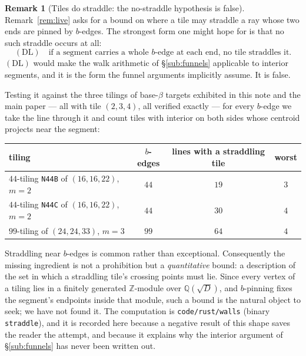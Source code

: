 \documentclass[11pt,reqno]{amsart}
\theoremstyle{plain}
\theoremstyle{definition}
\newtheorem{remark}[theorem]{Remark}
\newcommand{\Q}{\mathbb{Q}}
\begin{document}
\begin{remark}[Tiles do straddle: the no-straddle hypothesis is false]\label{rem:straddle}
Remark~\ref{rem:live} asks for a bound on where a tile may straddle a ray whose two ends are pinned
by $b$-edges. The strongest form one might hope for is that no such straddle occurs at all:
\[
(\mathrm{DL})\quad\text{if a segment carries a whole } b\text{-edge at each end, no tile straddles it.}
\]
$(\mathrm{DL})$ would make the walk arithmetic of \S\ref{sub:funnels} applicable to interior
segments, and it is the form the funnel arguments implicitly assume. It is false.

Testing it against the three tilings of base-$\beta$ targets exhibited in this note and the main
paper --- all with tile $(2,3,4)$, all verified exactly --- for every $b$-edge we take the line
through it and count tiles with interior on both sides whose centroid projects near the segment:

\begin{center}
\begin{tabular}{lccc}
\toprule
tiling & $b$-edges & lines with a straddling tile & worst \\
\midrule
$44$-tiling \texttt{N44B} of $(16,16,22)$, $m=2$ & $44$ & $19$ & $3$\\
$44$-tiling \texttt{N44C} of $(16,16,22)$, $m=2$ & $44$ & $30$ & $4$\\
$99$-tiling of $(24,24,33)$, $m=3$              & $99$ & $64$ & $4$\\
\bottomrule
\end{tabular}
\end{center}

Straddling near $b$-edges is common rather than exceptional. Consequently the missing ingredient is
not a prohibition but a \emph{quantitative} bound: a description of the set in which a straddling
tile's crossing points must lie. Since every vertex of a tiling lies in a finitely generated
$\mathbb Z$-module over $\Q(\sqrt D)$, and $b$-pinning fixes the segment's endpoints inside that
module, such a bound is the natural object to seek; we have not found it. The computation is
\texttt{code/rust/walls} (binary \texttt{straddle}), and it is recorded here because a negative result of
this shape saves the reader the attempt, and because it explains why the interior argument of
\S\ref{sub:funnels} has never been written out.
\end{remark}
\end{document}
